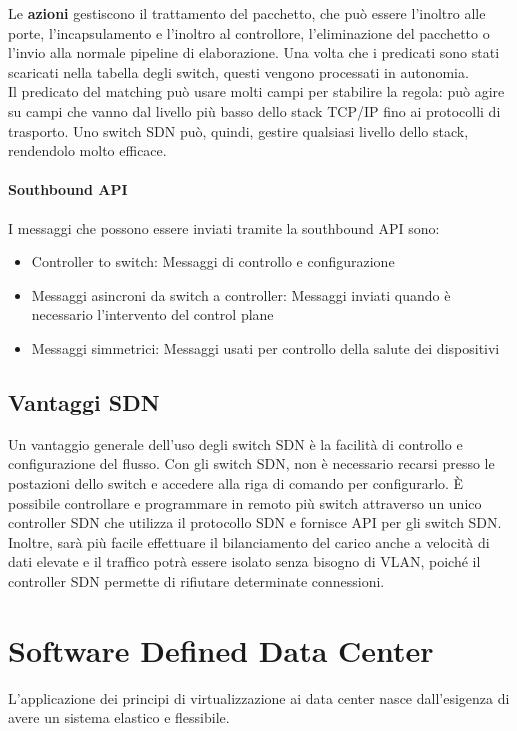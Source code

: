 \documentclass{article}
\begin{document}
		Le \textbf{azioni} gestiscono il trattamento del pacchetto, che può essere l'inoltro alle porte, l'incapsulamento e l'inoltro al controllore, l'eliminazione del pacchetto o l'invio alla normale pipeline di elaborazione. Una volta che i predicati sono stati scaricati nella tabella degli switch, questi vengono processati in autonomia.\\
		Il predicato del matching può usare molti campi per stabilire la regola: può agire su campi che vanno dal livello più basso dello stack TCP/IP fino ai protocolli di trasporto. Uno switch SDN può, quindi, gestire qualsiasi livello dello stack, rendendolo molto efficace.
		
		\paragraph{Southbound API}
		I messaggi che possono essere inviati tramite la southbound API sono:
		\begin{itemize}
		\item Controller to switch: Messaggi di controllo e configurazione
		\item Messaggi asincroni da switch a controller: Messaggi inviati quando è necessario l'intervento del control plane
		\item Messaggi simmetrici: Messaggi usati per controllo della salute dei dispositivi
		\end{itemize}
		
		\subsection{Vantaggi SDN}
		Un vantaggio generale dell'uso degli switch SDN è la facilità di controllo e configurazione del flusso. Con gli switch SDN, non è necessario recarsi presso le postazioni dello switch e accedere alla riga di comando per configurarlo. 
		È possibile controllare e programmare in remoto più switch attraverso un unico controller SDN che utilizza il protocollo SDN e fornisce API per gli switch SDN. 
		Inoltre, sarà più facile effettuare il bilanciamento del carico anche a velocità di dati elevate e il traffico potrà essere isolato senza bisogno di VLAN, poiché il controller SDN permette di rifiutare determinate connessioni.
		
		\newpage
		\section{Software Defined Data Center}
		L'applicazione dei principi di virtualizzazione ai data center nasce dall'esigenza di avere un sistema elastico e flessibile.
\end{document}
